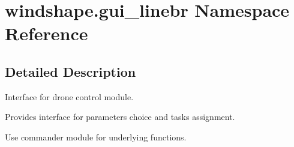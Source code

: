 \hypertarget{namespacewindshape_1_1gui__linebr}{}\section{windshape.\+gui\+\_\+linebr Namespace Reference}
\label{namespacewindshape_1_1gui__linebr}


\subsection{Detailed Description}
\begin{DoxyVerb}Interface for drone control module.

Provides interface for parameters choice and tasks assignment.

Use commander module for underlying functions.
\end{DoxyVerb}
 